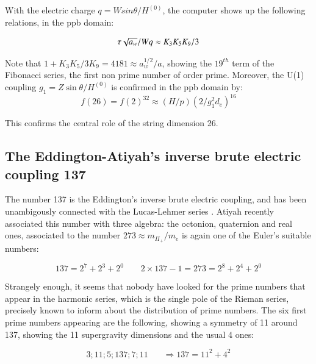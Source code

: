 \documentclass[a4paper,9pt]{article}
\newcounter{row}
\begin{document}
 

With the electric charge $q = Wsin\theta/H^{(0)}$, the computer shows up the following relations, in the ppb domain: 

\begin{equation}\label{Eq32}
 \tau \sqrt{a_w}/ W q \approx K_3 K_5 K_9/3 \\
\end{equation}

Note that $1 + K_3K_5/3K_9 = 4181 \approx a_w^{1/2}/a$, showing the $19^{th}$ term of the Fibonacci series, the first non prime number of order prime.
Moreover, the U(1) coupling $g_1 = Z\sin \theta/H^{(0)}$ is confirmed in the ppb domain by:
\begin{equation}\label{Eq33}
 f(26) = f(2)^{32} \approx (H/p)(2/g_1^2 d_e)^{16}
 \end{equation}
 
 This confirms the central role of the string dimension 26.
 

 
 
 

\subsection{The Eddington-Atiyah's inverse brute electric coupling 137}

The number 137 is the Eddington's inverse brute electric coupling, and has been unambigously connected with the Lucas-Lehmer series \cite{Sanchez3}. Atiyah recently associated this number with three algebra: the octonion, quaternion and real ones, associated to the number $273 \approx m_{\Pi_+}/m_e $ is again one of the Euler's suitable numbers:

\begin{equation}\label{Eq34}
137 = 2^7 + 2^3 + 2^0    ~~~~~~~~~2\times 137 - 1 = 273 = 2^8 + 2^4 + 2^0 
 \end{equation}

Strangely enough, it seems that nobody have looked for the prime numbers that appear in the harmonic series, which is the single pole of the Rieman series, precisely known to inform about the distribution of prime numbers. The six first prime numbers appearing are the following, showing a symmetry of 11 around 137, showing the 11 supergravity dimensions and the usual 4 ones:

\begin{equation}\label{Eq35}
3; 11; 5; 137; 7; 11   ~~~~~~~~ \Rightarrow 137 = 11^2 + 4^2 
 \end{equation}
\end{document}
